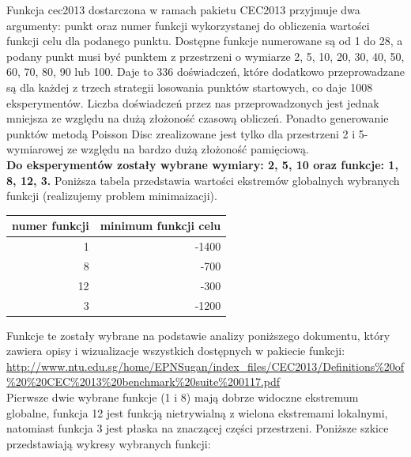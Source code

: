 \documentclass{article}
\begin{document}
Funkcja cec2013 dostarczona w ramach pakietu CEC2013 przyjmuje dwa argumenty: punkt oraz numer funkcji wykorzystanej do obliczenia wartości funkcji celu dla podanego punktu. Dostępne funkcje numerowane są od 1 do 28, a podany punkt musi być punktem z przestrzeni o wymiarze 2, 5, 10, 20, 30, 40, 50, 60, 70, 80, 90 lub 100. Daje to 336 doświadczeń, które dodatkowo przeprowadzane są dla każdej z trzech strategii losowania punktów startowych, co daje 1008 eksperymentów. Liczba doświadczeń przez nas przeprowadzonych jest jednak mniejsza ze względu na dużą złożoność czasową obliczeń. Ponadto generowanie punktów metodą Poisson Disc zrealizowane jest tylko dla przestrzeni 2 i 5-wymiarowej ze względu na bardzo dużą złożoność pamięciową.\\
\textbf{Do eksperymentów zostały wybrane wymiary: 2, 5, 10 oraz funkcje: 1, 8, 12, 3.} Poniższa tabela przedstawia wartości ekstremów globalnych wybranych funkcji (realizujemy problem minimaizacji).\\
\begin{center}
\begin{tabular}{|r|r|}
  \hline 
  numer funkcji & minimum funkcji celu\\
  \hline 
  1 & -1400\\
  \hline
  8 & -700 \\
  \hline
  12 & -300 \\
  \hline
  3 & -1200 \\
  \hline
\end{tabular}
\end{center}
Funkcje te zostały wybrane na podstawie analizy poniższego dokumentu, który zawiera opisy i wizualizacje wszystkich dostępnych w pakiecie funkcji:\\
\url{http://www.ntu.edu.sg/home/EPNSugan/index_files/CEC2013/Definitions%20of%20%20CEC%2013%20benchmark%20suite%200117.pdf} \\
Pierwsze dwie wybrane funkcje (1 i 8) mają dobrze widoczne ekstremum globalne, funkcja 12 jest funkcją nietrywialną z wielona ekstremami lokalnymi, natomiast funkcja 3 jest płaska na znaczącej części przestrzeni.
\newpage
Poniższe szkice przedstawiają wykresy wybranych funkcji:\\
\end{document}
